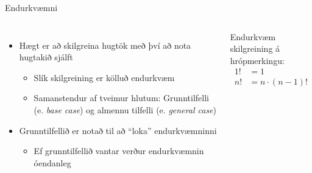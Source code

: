\documentclass{beamer}
\begin{document}
\begin{frame}[fragile]{Endurkvæmni}
\begin{columns}
\begin{itemize}
 \item Hægt er að skilgreina hugtök með því að nota hugtakið sjálft
 \begin{itemize}
  \item Slík skilgreining er kölluð endurkvæm
  \item Samanstendur af tveimur hlutum: Grunntilfelli (e. \emph{base case}) og almennu tilfelli (e. \emph{general case})
 \end{itemize}
 \item Grunntilfellið er notað til að ``loka'' endurkvæmninni
 \begin{itemize}
  \item Ef grunntilfellið vantar verður endurkvæmnin óendanleg
 \end{itemize}
\end{itemize}

\vspace{0.1cm}
Endurkvæm skilgreining á hrópmerkingu:
\begin{align*}
1! &= 1\\
n! &= n\cdot(n-1)!\\
\end{align*}

\end{columns}
\end{frame}
\end{document}
